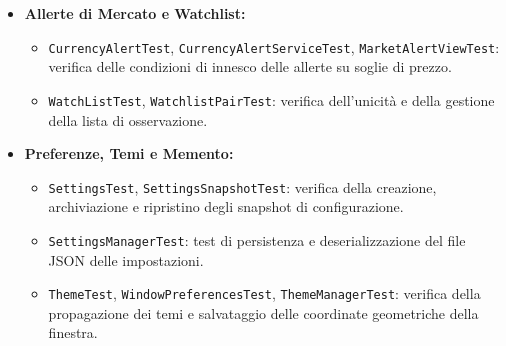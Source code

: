 \documentclass[11pt,a4paper,openright]{report}
\begin{document}
\begin{itemize}
\begin{itemize}
  \end{itemize}
  \item \textbf{Allerte di Mercato e Watchlist:}
  \begin{itemize}
    \item \texttt{CurrencyAlertTest}, \texttt{CurrencyAlertServiceTest}, \texttt{MarketAlertViewTest}: verifica delle condizioni di innesco delle allerte su soglie di prezzo.
    \item \texttt{WatchListTest}, \texttt{WatchlistPairTest}: verifica dell'unicità e della gestione della lista di osservazione.
  \end{itemize}
  \item \textbf{Preferenze, Temi e Memento:}
  \begin{itemize}
    \item \texttt{SettingsTest}, \texttt{SettingsSnapshotTest}: verifica della creazione, archiviazione e ripristino degli snapshot di configurazione.
    \item \texttt{SettingsManagerTest}: test di persistenza e deserializzazione del file JSON delle impostazioni.
    \item \texttt{ThemeTest}, \texttt{WindowPreferencesTest}, \texttt{ThemeManagerTest}: verifica della propagazione dei temi e salvataggio delle coordinate geometriche della finestra.
  \end{itemize}
\end{itemize}
\end{document}
